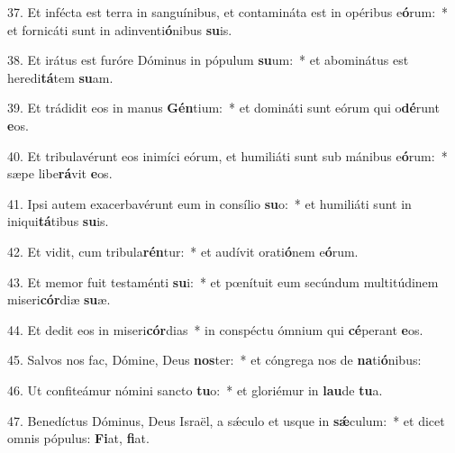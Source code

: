 37. Et infécta est terra in sanguínibus, et contamináta est in opéribus e\textbf{ó}rum:~*  et fornicáti sunt in adinventi\textbf{ó}nibus \textbf{su}is.\

38. Et irátus est furóre Dóminus in pópulum \textbf{su}um:~*  et abominátus est heredi\textbf{tá}tem \textbf{su}am.\

39. Et trádidit eos in manus \textbf{Gén}tium:~*  et domináti sunt eórum qui o\textbf{dé}runt \textbf{e}os.\

40. Et tribulavérunt eos inimíci eórum, et humiliáti sunt sub mánibus e\textbf{ó}rum:~*  sæpe libe\textbf{rá}vit \textbf{e}os.\

41. Ipsi autem exacerbavérunt eum in consílio \textbf{su}o:~*  et humiliáti sunt in iniqui\textbf{tá}tibus \textbf{su}is.\

42. Et vidit, cum tribula\textbf{rén}tur:~*  et audívit orati\textbf{ó}nem e\textbf{ó}rum.\

43. Et memor fuit testaménti \textbf{su}i:~*  et pœnítuit eum secúndum multitúdinem miseri\textbf{cór}diæ \textbf{su}æ.\

44. Et dedit eos in miseri\textbf{cór}dias~*  in conspéctu ómnium qui \textbf{cé}perant \textbf{e}os.\

45. Salvos nos fac, Dómine, Deus \textbf{nos}ter:~*  et cóngrega nos de \textbf{na}ti\textbf{ó}nibus:\

46. Ut confiteámur nómini sancto \textbf{tu}o:~*  et gloriémur in \textbf{lau}de \textbf{tu}a.\

47. Benedíctus Dóminus, Deus Israël, a sǽculo et usque in \textbf{sǽ}culum:~*  et dicet omnis pópulus: \textbf{Fi}at, \textbf{fi}at.\

